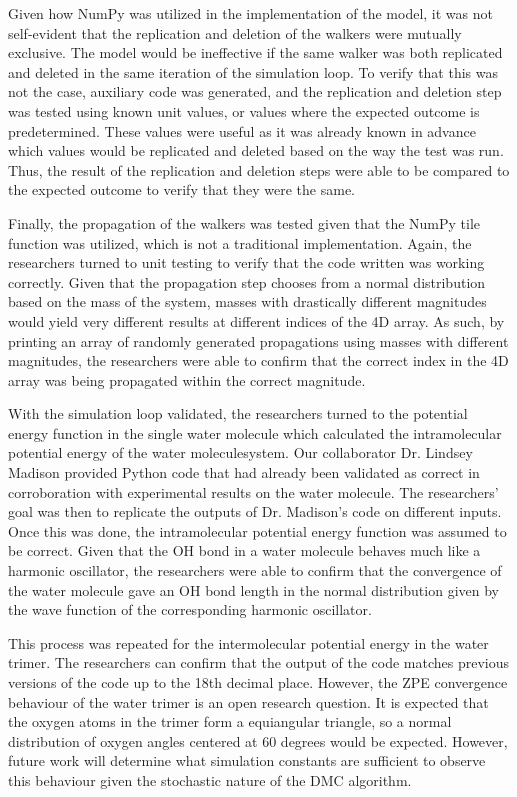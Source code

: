 \documentclass[journal=jacsat,manuscript=article]{achemso}
\begin{document}
Given how NumPy was utilized in the implementation of the model, it was not self-evident that the replication and deletion of the walkers were mutually exclusive. The model would be ineffective if the same walker was both replicated and deleted in the same iteration of the simulation loop. To verify that this was not the case, auxiliary code was generated, and the replication and deletion step was tested using known unit values, or values where the expected outcome is predetermined. These values were useful as it was already known in advance which values would be replicated and deleted based on the way the test was run. Thus, the result of the replication and deletion steps were able to be compared to the expected outcome to verify that they were the same.

Finally, the propagation of the walkers was tested given that the NumPy tile function was utilized, which is not a traditional implementation. Again, the researchers turned to unit testing to verify that the code written was working correctly. Given that the propagation step chooses from a normal distribution based on the mass of the system, masses with drastically different magnitudes would yield very different results at different indices of the 4D array. As such, by printing an array of randomly generated propagations using masses with different magnitudes, the researchers were able to confirm that the correct index in the 4D array was being propagated within the correct magnitude. 

With the simulation loop validated, the researchers turned to the potential energy function in the single water molecule which calculated the intramolecular potential energy of the water moleculesystem. Our collaborator Dr. Lindsey Madison provided Python code that had already been validated as correct in corroboration with experimental results on the water molecule.\cite{Stillinger1975} The researchers’ goal was then to replicate the outputs of Dr. Madison’s code on different inputs. Once this was done, the intramolecular potential energy function was assumed to be correct. Given that the OH bond in a water molecule behaves much like a harmonic oscillator, the researchers were able to confirm that the convergence of the water molecule gave an OH bond length in the normal distribution given by the wave function of the corresponding harmonic oscillator. 

This process was repeated for the intermolecular potential energy in the water trimer. The researchers can confirm that the output of the code matches previous versions of the code up to the 18th decimal place. However, the ZPE convergence behaviour of the water trimer is an open research question. It is expected that the oxygen atoms in the trimer form a equiangular triangle\cite{Madison2020}, so a normal distribution of oxygen angles centered at 60 degrees would be expected. However, future work will determine what simulation constants are sufficient to observe this behaviour given the stochastic nature of the DMC algorithm.
\end{document}
